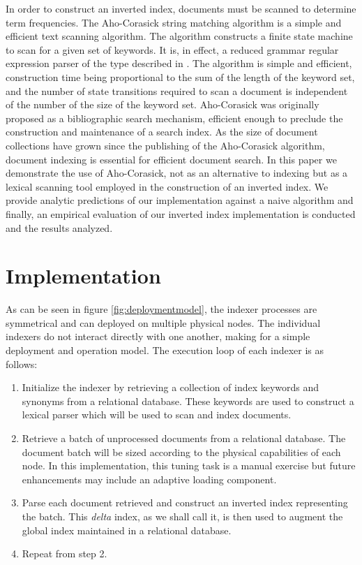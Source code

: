 \documentclass[10pt]{article}
\begin{document}
In order to construct an inverted index, documents must be scanned to
determine term frequencies. The Aho-Corasick string matching
algorithm\cite{RefWorks:103} is a simple and efficient text scanning algorithm. The
algorithm constructs a finite state machine to scan for a given set of
keywords. It is, in effect, a reduced grammar regular expression
parser of the type described in \cite{RefWorks:111}. The algorithm is simple and
efficient, construction time being proportional to the sum of the
length of the keyword set, and the number of state transitions
required to scan a document is independent of the number of the size
of the keyword set. Aho-Corasick was originally proposed as a
bibliographic search mechanism, efficient enough to preclude the
construction and maintenance of a search index. As the size of
document collections have grown since the publishing of the
Aho-Corasick algorithm, document indexing is essential for efficient
document search. In this paper we demonstrate the use of Aho-Corasick,
not as an alternative to indexing but as a lexical scanning tool
employed in the construction of an inverted index. We provide analytic
predictions of our implementation against a naive algorithm and
finally, an empirical evaluation of our inverted index implementation
is conducted and the results analyzed.


\section{Implementation}
\label{sec:implementation}
As can be seen in figure \ref{fig:deploymentmodel}, the indexer
processes are symmetrical and can deployed on multiple physical nodes. The
individual indexers do not interact directly with one another, making
for a simple deployment and operation model. The execution loop of
each indexer is as follows:

\begin{enumerate}
\item Initialize the indexer by retrieving a collection of index
  keywords and synonyms from a relational database. These keywords are
  used to construct a lexical parser which will be used to scan and
  index documents.
\item Retrieve a batch of unprocessed documents from a relational
  database. The document batch will be sized according to the physical
  capabilities of each node. In this implementation, this tuning task
  is a manual exercise but future enhancements may include an adaptive
  loading component.
\item Parse each document retrieved and construct an inverted index
  representing the batch. This \textit{delta} index, as we shall call
  it, is then used to augment the global index maintained in a
  relational database.
\item Repeat from step 2.
\end{enumerate}
\end{document}
